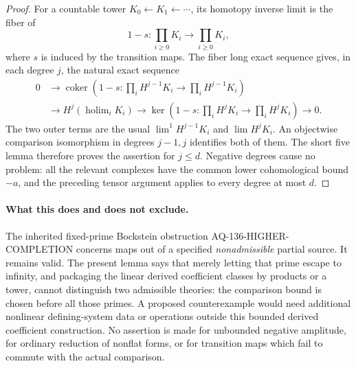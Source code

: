 \begin{proof}
For a countable tower $K_0\leftarrow K_1\leftarrow\cdots$,
its homotopy inverse limit is the fiber of
\[
 1-s:\prod_{i\geq0}K_i\longrightarrow\prod_{i\geq0}K_i,
\]
where $s$ is induced by the transition maps. The fiber long
exact sequence gives, in each degree $j$, the natural exact
sequence
\[
 \begin{split}
 0&\to\operatorname{coker}(1-s:\prod_iH^{j-1}K_i
                              \to\prod_iH^{j-1}K_i)\\
  &\to H^j(\operatorname{holim}_i K_i)
 \to\ker(1-s:\prod_iH^jK_i\to\prod_iH^jK_i)\to0.
 \end{split}
                                                               \tag{136.LP3}
\]
The two outer terms are the usual $\lim^1 H^{j-1}K_i$ and
$\lim H^jK_i$. An objectwise comparison isomorphism in degrees
$j-1,j$ identifies both of them. The short five lemma
therefore proves the assertion for $j\leq d$. Negative degrees
cause no problem: all the relevant complexes have the common
lower cohomological bound $-a$, and the preceding tensor
argument applies to every degree at most $d$.
\end{proof}

\paragraph{What this does and does not exclude.}
The inherited fixed-prime Bockstein obstruction
AQ-136-HIGHER-COMPLETION concerns maps out of a specified
\emph{nonadmissible} partial source. It remains valid.
The present lemma says that merely letting that prime escape
to infinity, and packaging the linear derived coefficient
classes by products or a tower, cannot distinguish two
admissible theories: the comparison bound is chosen before
all those primes. A proposed counterexample would need
additional nonlinear defining-system data or operations
outside this bounded derived coefficient construction.
No assertion is made for unbounded negative amplitude, for
ordinary reduction of nonflat forms, or for transition maps
which fail to commute with the actual comparison.
